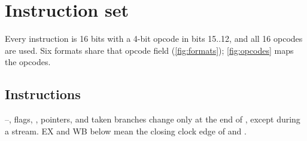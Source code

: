 \section{Instruction set}\label{sec:isa}

Every instruction is 16 bits with a 4-bit opcode in bits 15..12, and all 16 opcodes are used. Six formats share that opcode field (\cref{fig:formats}); \cref{fig:opcodes} maps the opcodes.



\subsection{Instructions}

--, flags, , pointers,  and taken branches change only at the end of , except during a stream. EX and WB below mean the closing clock edge of  and .

